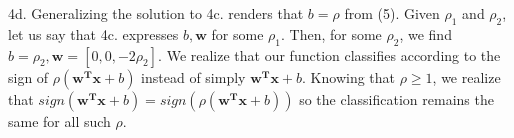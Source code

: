 \documentclass{article}
\begin{document}
4d.
Generalizing the solution to 4c. renders that \(b = \rho\) from (5). Given \(\rho_1\)
and \(\rho_2\), let us say that 4c. expresses \(b, \mathbf{w}\) for some \(\rho_1\). Then,
for some \(\rho_2\), we find \(b = \rho_2, \mathbf{w} = [0,0,-2\rho_2]\). We realize that
our function classifies according to the sign of \(\rho(\mathbf{w^Tx} + b)\) instead of
simply \(\mathbf{w^Tx} + b\). Knowing that \(\rho \geq 1\), we realize that
\(sign(\mathbf{w^Tx} + b) = sign(\rho(\mathbf{w^Tx} + b))\) so the classification
remains the same for all such \(\rho\).
\end{document}
